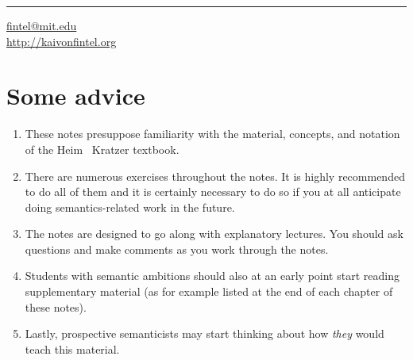 \plainbreak{1}

\href{mailto:fintel@mit.edu}{fintel@mit.edu}\\
\url{http://kaivonfintel.org} 

\cleardoublepage

\null
\vfill \ba 

\section*{Some advice}
\begin{enumerate}
\item These notes presuppose familiarity with the material, concepts,
  and notation of the Heim \amp\ Kratzer textbook.
\item There are numerous exercises throughout the notes. It is highly
  recommended to do all of them and it is certainly necessary to do so
  if you at all anticipate doing semantics-related work in the future.
\item The notes are designed to go along with explanatory lectures.
  You should ask questions and make comments as you work through the
  notes.
\item Students with semantic ambitions should also at an early point
  start reading supplementary material (as for example listed at the
  end of each chapter of these notes).
\item Lastly, prospective semanticists may start thinking about how
  \emph{they} would teach this material.
\end{enumerate}

\ab 
\vfill\null

\newpage\hbox{}
\vfill{\scshape{}}
\vfill\hbox{}\thispagestyle{cleared}